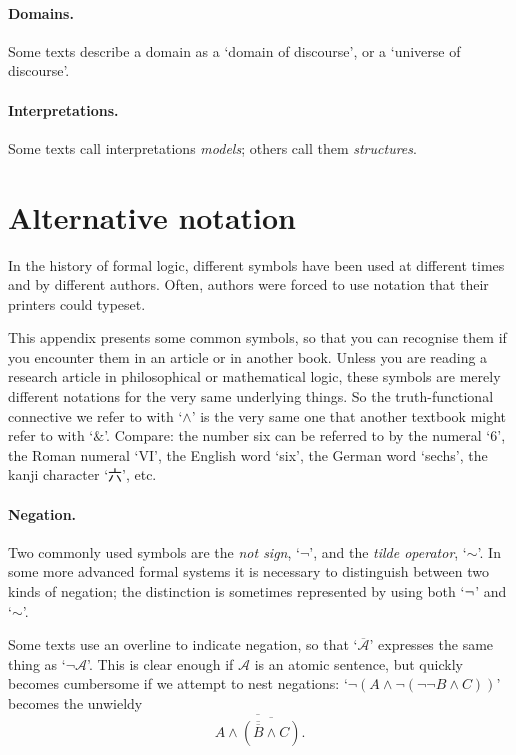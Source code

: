 \paragraph{Domains.} Some texts describe a domain as a `domain of discourse', or a `universe of discourse'.

\paragraph{Interpretations.} Some texts call interpretations \emph{models}; others call them \emph{structures}.

\section*{Alternative notation}
In the history of formal logic, different symbols have been used at different times and by different authors. Often, authors were forced to use notation that their printers could typeset.

This appendix presents some common symbols, so that you can recognise them if you encounter them in an article or in another book. Unless you are reading a research article in philosophical or mathematical logic, these symbols are merely different notations for the very same underlying things. So the truth-functional connective we refer to with `$\wedge$' is the very same one that another textbook might refer to with `$\&$'. Compare: the number six can be referred to by the numeral `$6$', the Roman numeral `VI', the English word `six', the German word `sechs', the kanji character `{\cjkfont 六}', etc.


\paragraph{Negation.} Two commonly used symbols are the \emph{not sign}, `$¬$', and the \emph{tilde operator}, `$∼$'. In some more advanced formal systems it is necessary to distinguish between two kinds of negation; the distinction is sometimes represented by using both `$\neg$' and `$∼$'. 

Some texts use an overline to indicate negation, so that `$\overline{\mathscr{A}}$' expresses the same thing as `$¬\mathscr{A}$'. This is clear enough if $\mathscr{A}$ is an atomic sentence, but quickly becomes cumbersome if we attempt to nest negations: `$¬(A \wedge ¬(¬¬B \wedge C))$' becomes the unwieldy $$\overline{A \wedge \overline{(\overline{\overline{B}}\wedge C)}}.$$

